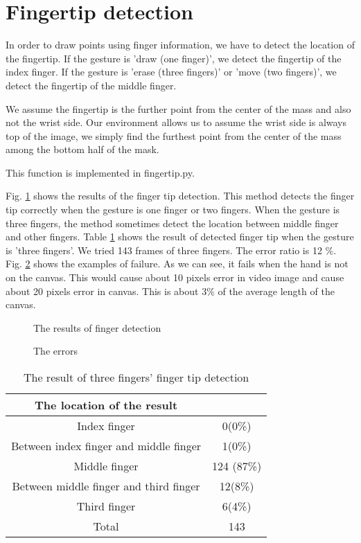 \section{Fingertip detection}
In order to draw points using finger information, we have to detect the location of the fingertip.
If the gesture is 'draw (one finger)', we detect the fingertip of the index finger. 
If the gesture is 'erase (three fingers)' or 'move (two fingers)', we detect the fingertip of the middle finger. \par
We assume the fingertip is the further point from the center of the mass and also not the wrist side.
Our environment allows us to assume the wrist side is always top of the image, we simply find the furthest point from the center of the mass among the bottom half of the mask.

This function is implemented in fingertip.py. 

Fig. \ref{fig:finger} shows the results of the finger tip detection.
This method detects the finger tip correctly when the gesture is one finger or two fingers.
When the gesture is three fingers, the method sometimes detect the location between middle finger and other fingers.
Table \ref{tb:finger} shows the result of detected finger tip when the gesture is 'three fingers'.
We tried 143 frames of three fingers.
The error ratio is 12 \%. Fig. \ref{fig:errorfinger} shows the examples of failure. As we can see, it fails when the hand is not on the canvas. This would cause about 10 pixels error in video image and cause about 20 pixels error in canvas. This is about 3\% of the average length of the canvas.

\begin{figure}[htbp]
 \centering
 
 \caption{The results of finger detection}
\label{fig:finger}
\end{figure}

\begin{figure}[htbp]
 \centering
 
 \caption{The errors}
\label{fig:errorfinger}
\end{figure}

\begin{table}
 \caption{The result of three fingers' finger tip detection}
 \label{tb:finger}
 \begin{tabular}{|c|c|}
 \hline
 The location of the result &  \\ \hline
 Index finger & 0(0\%) \\ \hline
 Between index finger and middle finger & 1(0\%) \\ \hline
 Middle finger & 124 (87\%) \\ \hline
 Between middle finger and third finger & 12(8\%) \\ \hline
 Third finger & 6(4\%) \\ \hline
 Total & 143 \\ \hline
 \end{tabular}
\end{table}
